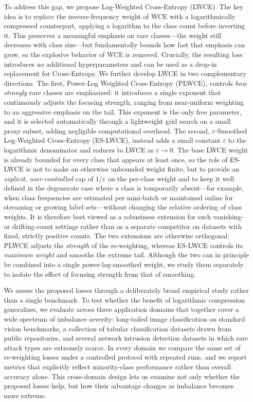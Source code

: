 \documentclass[a4paper,fleqn]{cas-sc}
\begin{document}
To address this gap, we propose Log-Weighted Cross-Entropy (LWCE). The
key idea is to replace the inverse-frequency weight of WCE with a logarithmically
compressed counterpart, applying a logarithm to the class count before inverting
it. This preserves a meaningful emphasis on rare classes---the weight still
decreases with class size---but fundamentally bounds how fast that emphasis can
grow, so the explosive behavior of WCE is removed. Crucially, the resulting loss
introduces no additional hyperparameters and can be used as a drop-in replacement
for Cross-Entropy. We further develop LWCE in two complementary directions. The
first, Power-Log Weighted Cross-Entropy (PLWCE), controls \emph{how strongly}
rare classes are emphasized: it introduces a single exponent that continuously
adjusts the focusing strength, ranging from near-uniform weighting to an
aggressive emphasis on the tail. This exponent is the only free parameter, and
it is selected automatically through a lightweight grid search on a small proxy
subset, adding negligible computational overhead. The second,
$\varepsilon$-Smoothed Log-Weighted Cross-Entropy (ES-LWCE), instead adds a small
constant $\varepsilon$ to the logarithmic denominator and reduces to LWCE as
$\varepsilon \to 0$. The base LWCE weight is already bounded for every class that
appears at least once, so the role of ES-LWCE is not to make an otherwise unbounded
weight finite, but to provide an \emph{explicit, user-controlled} cap of
$1/\varepsilon$ on the per-class weight and to keep it well defined in the
degenerate case where a class is temporarily absent---for example, when class
frequencies are estimated per mini-batch or maintained online for streaming or
growing label sets---without changing the relative ordering of class weights. It is
therefore best viewed as a robustness extension for such vanishing- or
drifting-count settings rather than as a separate competitor on datasets with
fixed, strictly positive counts. The two extensions are otherwise orthogonal: PLWCE
adjusts the \emph{strength} of the re-weighting, whereas ES-LWCE controls its
\emph{maximum weight} and smooths the extreme tail. Although the two can in
principle be combined into a single power-log-smoothed weight, we study them
separately to isolate the effect of focusing strength from that of smoothing.

We assess the proposed losses through a deliberately broad empirical study rather
than a single benchmark. To test whether the benefit of logarithmic compression
generalizes, we evaluate across three application domains that together cover a
wide spectrum of imbalance severity: long-tailed image classification on standard
vision benchmarks, a collection of tabular classification datasets drawn from
public repositories, and several network intrusion detection datasets in which
rare attack types are extremely scarce. In every domain we compare the same set
of re-weighting losses under a controlled protocol with repeated runs, and we
report metrics that explicitly reflect minority-class performance rather than
overall accuracy alone. This cross-domain design lets us examine not only whether
the proposed losses help, but how their advantage changes as imbalance becomes
more extreme.
\end{document}
